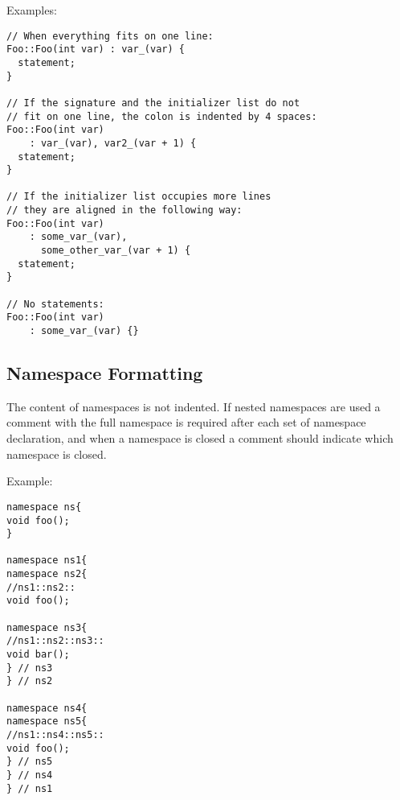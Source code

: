 \documentclass[a4paper]{article}
\begin{document}
Examples:
\begin{lstlisting}
// When everything fits on one line:
Foo::Foo(int var) : var_(var) {
  statement;
}

// If the signature and the initializer list do not
// fit on one line, the colon is indented by 4 spaces:
Foo::Foo(int var)
    : var_(var), var2_(var + 1) {
  statement;
}

// If the initializer list occupies more lines
// they are aligned in the following way:
Foo::Foo(int var)
    : some_var_(var),
      some_other_var_(var + 1) {
  statement;
}

// No statements:
Foo::Foo(int var)
    : some_var_(var) {}
\end{lstlisting}

\subsection{Namespace Formatting}

The content of namespaces is not indented.
If nested namespaces are used a comment with the full namespace is required after each set of namespace declaration,
and when a namespace is closed a comment should indicate which namespace is closed.

Example:
\begin{lstlisting}
namespace ns{
void foo();
}

namespace ns1{
namespace ns2{
//ns1::ns2::
void foo();

namespace ns3{
//ns1::ns2::ns3::
void bar();
} // ns3
} // ns2

namespace ns4{
namespace ns5{
//ns1::ns4::ns5::
void foo();
} // ns5
} // ns4
} // ns1
\end{lstlisting}
\end{document}

